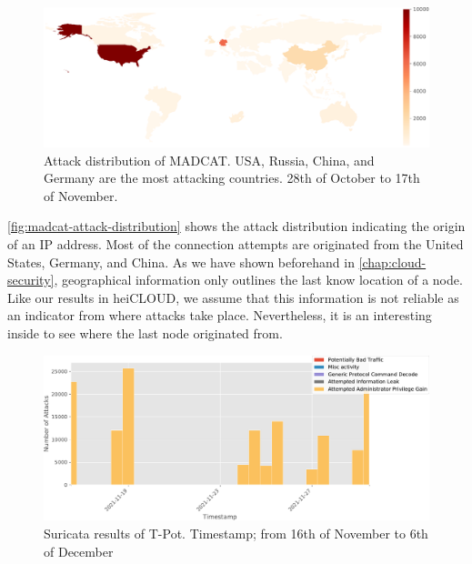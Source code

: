 \begin{figure}[ht]
    \centering
    \includegraphics[width=\textwidth]{figures/madcat-overview-map.pdf}
    \caption[Attack distribution of MADCAT]{Attack distribution of MADCAT. USA, Russia, China, and Germany are the most attacking countries. 28th of October to 17th of November.}
    \label{fig:madcat-attack-distribution}
\end{figure}

\autoref{fig:madcat-attack-distribution} shows the attack distribution indicating the origin of an IP address.
Most of the connection attempts are originated from the United States, Germany, and China.
As we have shown beforehand in \autoref{chap:cloud-security}, geographical information only outlines the last know location of a node.
Like our results in heiCLOUD, we assume that this information is not reliable as an indicator from where attacks take place.
Nevertheless, it is an interesting inside to see where the last node originated from.

\begin{figure}[ht]
    \centering
    \includegraphics[width=\textwidth]{figures/madcat-suricata-alerts.pdf}
    \caption[Suricata results of T-Pot]{Suricata results of T-Pot. Timestamp; from 16th of November to 6th of December}
    \label{fig:suricata-distribution}
\end{figure}

